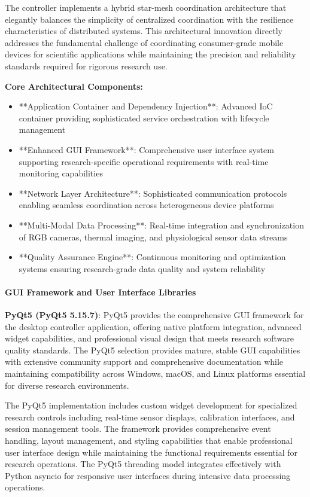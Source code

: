 \documentclass[11pt,a4paper]{report}
\begin{document}
The controller implements a hybrid star-mesh coordination architecture that elegantly balances the simplicity of
centralized coordination with the resilience characteristics of distributed systems. This architectural innovation
directly addresses the fundamental challenge of coordinating consumer-grade mobile devices for scientific applications
while maintaining the precision and reliability standards required for rigorous research use.

\textbf{Core Architectural Components:}

\begin{itemize}
\item **Application Container and Dependency Injection**: Advanced IoC container providing sophisticated service
  orchestration with lifecycle management
\item **Enhanced GUI Framework**: Comprehensive user interface system supporting research-specific operational requirements
  with real-time monitoring capabilities
\item **Network Layer Architecture**: Sophisticated communication protocols enabling seamless coordination across
  heterogeneous device platforms
\item **Multi-Modal Data Processing**: Real-time integration and synchronization of RGB cameras, thermal imaging, and
  physiological sensor data streams
\item **Quality Assurance Engine**: Continuous monitoring and optimization systems ensuring research-grade data quality and
  system reliability

\end{itemize}
\paragraph{GUI Framework and User Interface Libraries}

\textbf{PyQt5 (PyQt5 5.15.7)}: PyQt5 provides the comprehensive GUI framework for the desktop controller application,
offering native platform integration, advanced widget capabilities, and professional visual design that meets research
software quality standards. The PyQt5 selection provides mature, stable GUI capabilities with extensive community
support and comprehensive documentation while maintaining compatibility across Windows, macOS, and Linux platforms
essential for diverse research environments.

The PyQt5 implementation includes custom widget development for specialized research controls including real-time sensor
displays, calibration interfaces, and session management tools. The framework provides comprehensive event handling,
layout management, and styling capabilities that enable professional user interface design while maintaining the
functional requirements essential for research operations. The PyQt5 threading model integrates effectively with Python
asyncio for responsive user interfaces during intensive data processing operations.
\end{document}
